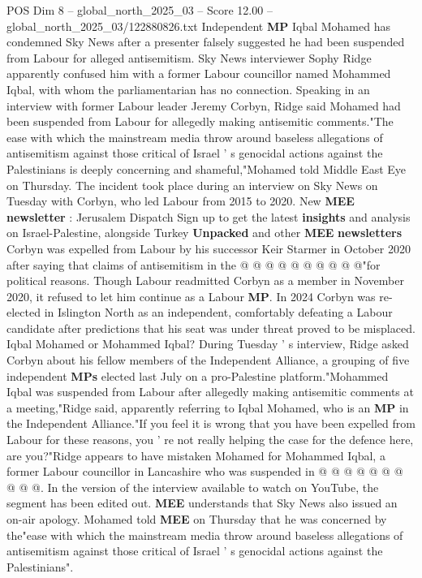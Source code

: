 \begin{textsample}{POS Dim 8 – global\_north\_2025\_03 – Score 12.00 – global\_north\_2025\_03/122880826.txt}  \label{ex:f8_pos_090}
Independent \textbf{MP} Iqbal Mohamed has condemned Sky News after a presenter falsely suggested he had been suspended from Labour for alleged antisemitism.
Sky News interviewer Sophy Ridge apparently confused him with a former Labour councillor named Mohammed Iqbal, with whom the parliamentarian has no connection.
Speaking in an interview with former Labour leader Jeremy Corbyn, Ridge said Mohamed had been suspended from Labour for allegedly making antisemitic comments."The ease with which the mainstream media throw around baseless allegations of antisemitism against those critical of Israel ' s genocidal actions against the Palestinians is deeply concerning and shameful,"Mohamed told Middle East Eye on Thursday.
The incident took place during an interview on Sky News on Tuesday with Corbyn, who led Labour from 2015 to 2020.
New \textbf{MEE} \textbf{newsletter} : Jerusalem Dispatch Sign up to get the latest \textbf{insights} and analysis on Israel-Palestine, alongside Turkey \textbf{Unpacked} and other \textbf{MEE} \textbf{newsletters} Corbyn was expelled from Labour by his successor Keir Starmer in October 2020 after saying that claims of antisemitism in the @ @ @ @ @ @ @ @ @ @"for political reasons.
Though Labour readmitted Corbyn as a member in November 2020, it refused to let him continue as a Labour \textbf{MP}.
In 2024 Corbyn was re-elected in Islington North as an independent, comfortably defeating a Labour candidate after predictions that his seat was under threat proved to be misplaced.
Iqbal Mohamed or Mohammed Iqbal?
During Tuesday ' s interview, Ridge asked Corbyn about his fellow members of the Independent Alliance, a grouping of five independent \textbf{MPs} elected last July on a pro-Palestine platform."Mohammed Iqbal was suspended from Labour after allegedly making antisemitic comments at a meeting,"Ridge said, apparently referring to Iqbal Mohamed, who is an \textbf{MP} in the Independent Alliance."If you feel it is wrong that you have been expelled from Labour for these reasons, you ' re not really helping the case for the defence here, are you?"Ridge appears to have mistaken Mohamed for Mohammed Iqbal, a former Labour councillor in Lancashire who was suspended in @ @ @ @ @ @ @ @ @ @.
In the version of the interview available to watch on YouTube, the segment has been edited out. \textbf{MEE} understands that Sky News also issued an on-air apology.
Mohamed told \textbf{MEE} on Thursday that he was concerned by the"ease with which the mainstream media throw around baseless allegations of antisemitism against those critical of Israel ' s genocidal actions against the Palestinians".

\end{textsample}
